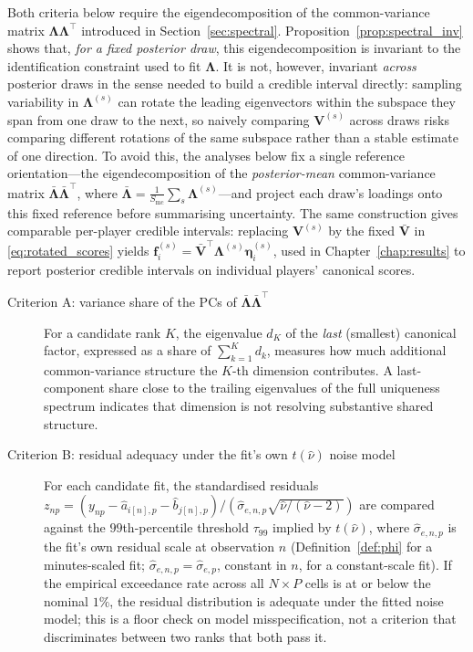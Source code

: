 \begin{remark}
\label{rem:posterior_mean_anchor}
Both criteria below require the eigendecomposition of the common-variance matrix $\boldsymbol{\Lambda}\boldsymbol{\Lambda}^\top$ introduced in Section~\ref{sec:spectral}. Proposition~\ref{prop:spectral_inv} shows that, \emph{for a fixed posterior draw}, this eigendecomposition is invariant to the identification constraint used to fit $\boldsymbol{\Lambda}$. It is not, however, invariant \emph{across} posterior draws in the sense needed to build a credible interval directly: sampling variability in $\boldsymbol{\Lambda}^{(s)}$ can rotate the leading eigenvectors within the subspace they span from one draw to the next, so naively comparing $\mathbf{V}^{(s)}$ across draws risks comparing different rotations of the same subspace rather than a stable estimate of one direction. To avoid this, the analyses below fix a single reference orientation---the eigendecomposition of the \emph{posterior-mean} common-variance matrix $\bar{\boldsymbol{\Lambda}}\bar{\boldsymbol{\Lambda}}^\top$, where $\bar{\boldsymbol{\Lambda}} = \tfrac{1}{S_{\mathrm{mc}}}\sum_s \boldsymbol{\Lambda}^{(s)}$---and project each draw's loadings onto this fixed reference before summarising uncertainty. The same construction gives comparable per-player credible intervals: replacing $\mathbf{V}^{(s)}$ by the fixed $\bar{\mathbf{V}}$ in \eqref{eq:rotated_scores} yields $\mathbf{f}_i^{(s)} = \bar{\mathbf{V}}^\top\boldsymbol{\Lambda}^{(s)}\boldsymbol{\eta}_i^{(s)}$, used in Chapter~\ref{chap:results} to report posterior credible intervals on individual players' canonical scores.
\end{remark}

\begin{description}
\item[Criterion A: variance share of the PCs of $\bar{\boldsymbol{\Lambda}}\bar{\boldsymbol{\Lambda}}^\top$] For a candidate rank $K$, the eigenvalue $d_K$ of the \emph{last} (smallest) canonical factor, expressed as a share of $\sum_{k=1}^K d_k$, measures how much additional common-variance structure the $K$-th dimension contributes. A last-component share close to the trailing eigenvalues of the full uniqueness spectrum indicates that dimension is not resolving substantive shared structure.
\item[Criterion B: residual adequacy under the fit's own $t(\hat\nu)$ noise model] For each candidate fit, the standardised residuals $z_{np} = (y_{np} - \hat a_{i[n],p} - \hat b_{j[n],p})/(\hat\sigma_{e,n,p}\sqrt{\hat\nu/(\hat\nu-2)})$ are compared against the $99$th-percentile threshold $\tau_{99}$ implied by $t(\hat\nu)$, where $\hat\sigma_{e,n,p}$ is the fit's own residual scale at observation $n$ (Definition~\ref{def:phi} for a minutes-scaled fit; $\hat\sigma_{e,n,p}=\hat\sigma_{e,p}$, constant in $n$, for a constant-scale fit). If the empirical exceedance rate across all $N \times P$ cells is at or below the nominal $1\%$, the residual distribution is adequate under the fitted noise model; this is a floor check on model misspecification, not a criterion that discriminates between two ranks that both pass it.
\end{description}

